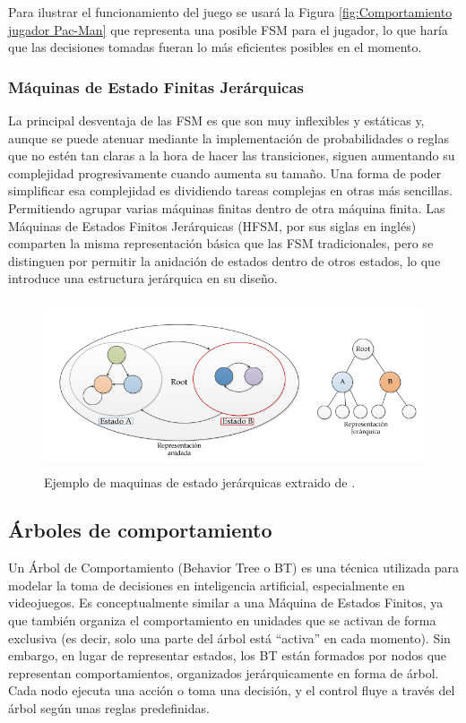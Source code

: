 Para ilustrar el funcionamiento del juego se usará la Figura \ref{fig:Comportamiento jugador Pac-Man} que representa una posible FSM para el jugador, lo que haría que las decisiones tomadas fueran lo más eficientes posibles en el momento.\\


\subsubsection{Máquinas de Estado Finitas Jerárquicas}

La principal desventaja de las FSM es que son muy inflexibles y estáticas y, aunque se puede atenuar mediante la implementación de probabilidades o reglas que no estén tan claras a la hora de hacer las transiciones, siguen aumentando su complejidad progresivamente cuando aumenta su tamaño. Una forma de poder simplificar esa complejidad es dividiendo tareas complejas en otras más sencillas. Permitiendo agrupar varias máquinas finitas dentro de otra máquina finita. Las Máquinas de Estados Finitos Jerárquicas (HFSM, por sus siglas en inglés) comparten la misma representación básica que las FSM tradicionales, pero se distinguen por permitir la anidación de estados dentro de otros estados, lo que introduce una estructura jerárquica en su diseño.
\begin{figure}[h!]
	\centering
	\includegraphics[height=5cm]{Imagenes/HFSM.png}
	\caption{Ejemplo de maquinas de estado jerárquicas extraido de \cite{JorgeHFSM}.}
	\label{fig:Maquinas de estado jerárquicas}
\end{figure}

\subsection{Árboles de comportamiento}

Un Árbol de Comportamiento (Behavior Tree o BT) es una técnica utilizada para modelar la toma de decisiones en inteligencia artificial, especialmente en videojuegos. Es conceptualmente similar a una Máquina de Estados Finitos, ya que también organiza el comportamiento en unidades que se activan de forma exclusiva (es decir, solo una parte del árbol está ``activa'' en cada momento). Sin embargo, en lugar de representar estados, los BT están formados por nodos que representan comportamientos, organizados jerárquicamente en forma de árbol. Cada nodo ejecuta una acción o toma una decisión, y el control fluye a través del árbol según unas reglas predefinidas. \\

